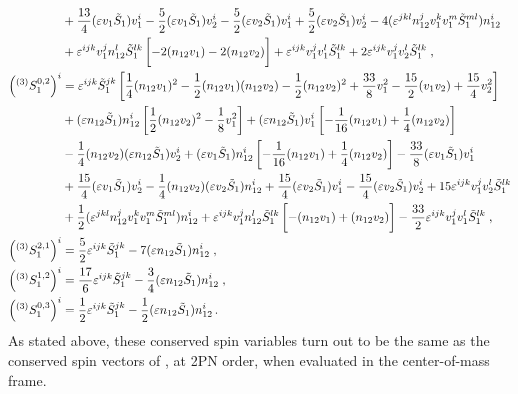 \documentclass[
superscriptaddress,
preprint,
prd,tightenlines,showpacs,nofootinbib,
eqsecnum,
amsfonts,amsmath,amssymb]{revtex4-1}
\begin{document}
\begin{align}
  & + \frac{13}{4} (\varepsilon{}v_{1}\tilde{S}_{1})v_{1}^{i} -
  \frac{5}{2} (\varepsilon{}v_{1}\tilde{S}_{1})v_{2}^{i} - \frac{5}{2}
  (\varepsilon{}v_{2}\tilde{S}_{1})v_{1}^{i} + \frac{5}{2}
  (\varepsilon{}v_{2}\tilde{S}_{1})v_{2}^{i} - 4
  (\varepsilon^{jkl}n_{12}^{j}v_{1}^{k}v_{1}^{m}\tilde{S}_{1}^{ml})
  n_{12}^{i} \nonumber \\
  & + \varepsilon^{ijk}v_{1}^{j}n_{12}^{l}\tilde{S}_{1}^{lk}
  \left[ -2 (n_{12}v_{1}) - 2 (n_{12}v_{2}) \vphantom{\frac{1}{2}} \right] + \varepsilon^{ijk}v_{1}^{j}v_{1}^{l}\tilde{S}_{1}^{lk} + 2 \varepsilon^{ijk}v_{1}^{j}v_{2}^{l}\tilde{S}_{1}^{lk} \;,\nonumber \\
  \left({}^{(3)}S_{1}^{0,2}\right)^{i} &=
  \varepsilon^{ijk}\tilde{S}_{1}^{jk} \left[ \frac{1}{4}
    (n_{12}v_{1})^2 - \frac{1}{2} (n_{12}v_{1}) (n_{12}v_{2}) -
    \frac{1}{2} (n_{12}v_{2})^2 + \frac{33}{8} v_{1}^{2} -
    \frac{15}{2} (v_{1}v_{2}) + \frac{15}{4} v_{2}^{2} \right] \nonumber \\
  & + (\varepsilon{}n_{12}\tilde{S}_{1})n_{12}^{i} \left[ \frac{1}{2}
    (n_{12}v_{2})^2 - \frac{1}{8} v_{1}^{2} \right] +
  (\varepsilon{}n_{12}\tilde{S}_{1})v_{1}^{i} \left[ -\frac{1}{16}
    (n_{12}v_{1}) +
    \frac{1}{4} (n_{12}v_{2}) \right] \nonumber \\
  & - \frac{1}{4} (n_{12}v_{2})
  (\varepsilon{}n_{12}\tilde{S}_{1})v_{2}^{i} +
  (\varepsilon{}v_{1}\tilde{S}_{1})n_{12}^{i} \left[ -\frac{1}{16}
    (n_{12}v_{1}) +
    \frac{1}{4} (n_{12}v_{2}) \right] - \frac{33}{8} (\varepsilon{}v_{1}\tilde{S}_{1})v_{1}^{i} \nonumber \\
  & + \frac{15}{4} (\varepsilon{}v_{1}\tilde{S}_{1})v_{2}^{i} -
  \frac{1}{4} (n_{12}v_{2})
  (\varepsilon{}v_{2}\tilde{S}_{1})n_{12}^{i} + \frac{15}{4} (\varepsilon{}v_{2}\tilde{S}_{1})v_{1}^{i} - \frac{15}{4} (\varepsilon{}v_{2}\tilde{S}_{1})v_{2}^{i} + 15 \varepsilon^{ijk}v_{1}^{j}v_{2}^{l}\tilde{S}_{1}^{lk} \nonumber \\
  & + \frac{1}{2} (\varepsilon^{jkl}n_{12}^{j}v_{1}^{k}v_{1}^{m}
  \tilde{S}_{1}^{ml}) n_{12}^{i} +
  \varepsilon^{ijk}v_{1}^{j}n_{12}^{l}\tilde{S}_{1}^{lk} \left[ -
    (n_{12}v_{1}) + (n_{12}v_{2}) \vphantom{\frac{1}{2}} \right] -
  \frac{33}{2} \varepsilon^{ijk}v_{1}^{j}v_{1}^{l}
  \tilde{S}_{1}^{lk} \;, \nonumber \\
  \left({}^{(3)}S_{1}^{2,1}\right)^{i} &=
  \frac{5}{2} \varepsilon^{ijk}\tilde{S}_{1}^{jk} - 7 (\varepsilon{}n_{12}\tilde{S}_{1})n_{12}^{i} \;,\nonumber \\
  \left({}^{(3)}S_{1}^{1,2}\right)^{i} &=
  \frac{17}{6} \varepsilon^{ijk}\tilde{S}_{1}^{jk} - \frac{3}{4} (\varepsilon{}n_{12}\tilde{S}_{1})n_{12}^{i} \;, \nonumber \\
  \left({}^{(3)}S_{1}^{0,3}\right)^{i} &= \frac{1}{2}
  \varepsilon^{ijk}\tilde{S}_{1}^{jk} - \frac{1}{2}
  (\varepsilon{}n_{12}\tilde{S}_{1})n_{12}^{i} \, .
\end{align}
As stated above, these conserved spin variables turn out to be the
same as the conserved spin vectors of \cite{Blanchet2006}, at 2PN
order, when evaluated in the center-of-mass frame.
\end{document}
